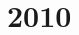 \chapter{2010}
\label{cha:2010}

\begin{Problema}{1}
  
\end{Problema}

\begin{Solucion}
  
\end{Solucion}

\begin{Problema}{2}
  
\end{Problema}

\begin{Solucion}
  
\end{Solucion}

\begin{Problema}{3}
  
\end{Problema}

\begin{Solucion}
  
\end{Solucion}

\begin{Problema}{4}
  
\end{Problema}

\begin{Solucion}
  
\end{Solucion}

\begin{Problema}{5}
  
\end{Problema}

\begin{Solucion}
  
\end{Solucion}

\begin{Problema}{6}
  
\end{Problema}

\begin{Solucion}
  
\end{Solucion}

